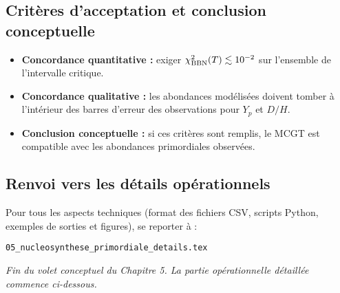 \subsection{Critères d’acceptation et conclusion conceptuelle}

\begin{itemize}
  \item \textbf{Concordance quantitative :}  
    exiger \(\chi^{2}_{\rm BBN}(T)\lesssim10^{-2}\) sur l’ensemble de l’intervalle critique.  
  \item \textbf{Concordance qualitative :}  
    les abondances modélisées doivent tomber à l’intérieur des barres d’erreur des observations pour \(Y_{p}\) et \(D/H\).  
  \item \textbf{Conclusion conceptuelle :}  
    si ces critères sont remplis, le MCGT est compatible avec les abondances primordiales observées.
\end{itemize}

\subsection{Renvoi vers les détails opérationnels}

Pour tous les aspects techniques (format des fichiers CSV, scripts Python, exemples de sorties et figures), se reporter à :

\begin{center}
  \texttt{05\_nucleosynthese\_primordiale\_details.tex}
\end{center}

\noindent\emph{Fin du volet conceptuel du Chapitre 5. La partie opérationnelle détaillée commence ci-dessous.}